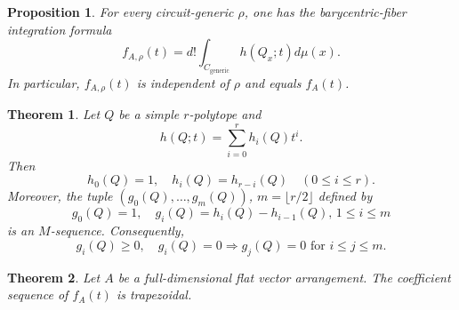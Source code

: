 \documentclass[10pt,a4paper]{amsart}
\newtheorem{proposition}{Proposition}
\newtheorem{theorem}{Theorem}
\begin{document}
\begin{proposition}
  \label{prop-bary-formula}
  For every circuit-generic $\rho$, one has the barycentric-fiber integration formula
  \begin{equation}
    f_{A,\rho}(t)=d! \int_{C_{\mathrm{generic}}} h(Q_x;t) d\mu(x).
  \end{equation}
  In particular, $f_{A,\rho}(t)$ is independent of $\rho$ and equals $f_A(t)$.
\end{proposition}

\begin{theorem}
  \label{thm-g-theorem}
  Let $Q$ be a simple $r$-polytope and
  \begin{equation}
    h(Q;t)=\sum_{i=0}^r h_i(Q)t^i.
  \end{equation}
  Then 
  \begin{equation*}
      h_0(Q)=1,\quad h_i(Q)=h_{r-i}(Q)\quad (0\leq i\leq r).
  \end{equation*}
  Moreover, the tuple $(g_0(Q),\dots,g_m(Q))$, $m=\lfloor r/2\rfloor$ defined by
  \begin{equation*}
    g_0(Q)=1,\quad g_i(Q)=h_i(Q)-h_{i-1}(Q), \,1\leq i\leq m
  \end{equation*}
  is an $M$-sequence. Consequently,
  \begin{equation}
    g_i(Q)\geq 0,\quad g_i(Q)=0 \Longrightarrow g_j(Q)=0\text{  for  } i\leq j\leq m.
  \end{equation}
\end{theorem}

\begin{theorem}
  \label{thm-main}
  Let $A$ be a full-dimensional flat vector arrangement. The coefficient sequence of $f_A(t)$ is trapezoidal.
\end{theorem}
\end{document}
